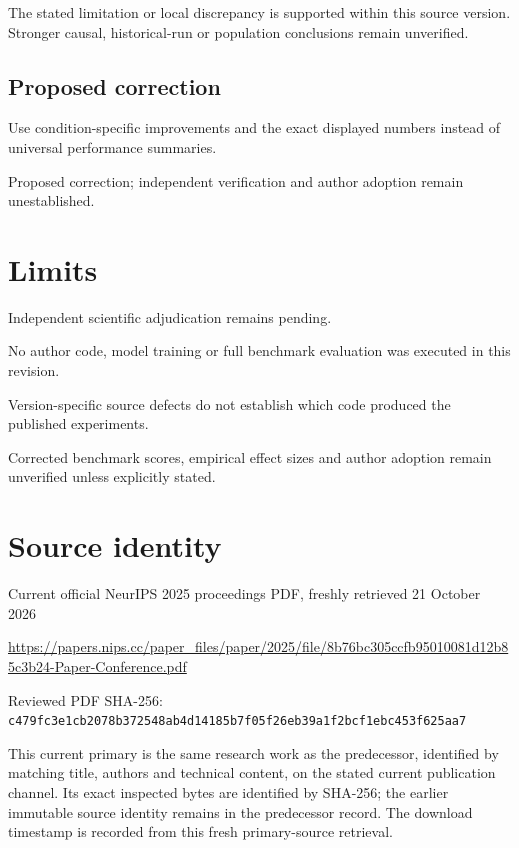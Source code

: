 \documentclass[11pt]{article}
\begin{document}
The stated limitation or local discrepancy is supported within this source version. Stronger causal, historical-run or population conclusions remain unverified.

\subsection*{Proposed correction}

Use condition-specific improvements and the exact displayed numbers instead of universal performance summaries.

Proposed correction; independent verification and author adoption remain unestablished.

\section*{Limits}

Independent scientific adjudication remains pending.\par

No author code, model training or full benchmark evaluation was executed in this revision.\par

Version-specific source defects do not establish which code produced the published experiments.\par

Corrected benchmark scores, empirical effect sizes and author adoption remain unverified unless explicitly stated.\par

\section*{Source identity}

Current official NeurIPS 2025 proceedings PDF, freshly retrieved 21 October 2026

\url{https://papers.nips.cc/paper_files/paper/2025/file/8b76bc305ccfb95010081d12b85c3b24-Paper-Conference.pdf}

Reviewed PDF SHA-256: \nolinkurl{c479fc3e1cb2078b372548ab4d14185b7f05f26eb39a1f2bcf1ebc453f625aa7}

This current primary is the same research work as the predecessor, identified by matching title, authors and technical content, on the stated current publication channel. Its exact inspected bytes are identified by SHA-256; the earlier immutable source identity remains in the predecessor record. The download timestamp is recorded from this fresh primary-source retrieval.
\end{document}
